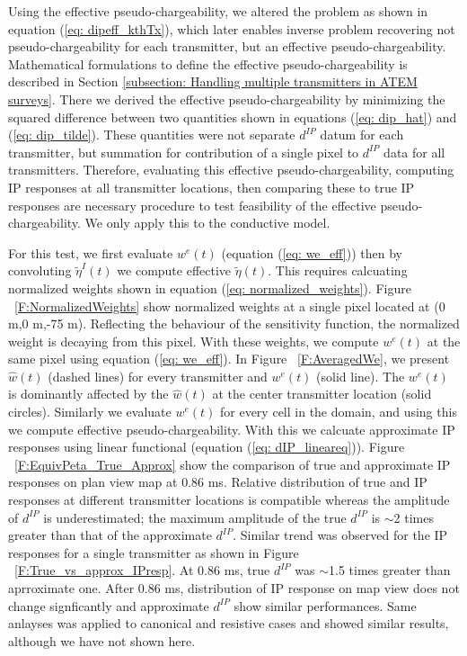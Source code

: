 \documentclass[extra,mreferee]{gji}
\newcommand{\peta}{\tilde{\eta}}
\newcommand{\dip}{d^{IP}}
\begin{document}
Using the effective pseudo-chargeability, we altered the problem as shown in equation (\ref{eq: dipeff_kthTx}), which later enables inverse problem recovering not pseudo-chargeability for each transmitter, but an effective pseudo-chargeability. Mathematical formulations to define the effective pseudo-chargeability is described in Section \ref{subsection: Handling multiple transmitters in ATEM surveys}. There we derived the effective pseudo-chargeability by minimizing the squared difference between two quantities shown in equations (\ref{eq: dip_hat}) and (\ref{eq: dip_tilde}). These quantities were not separate $\dip$ datum for each transmitter, but summation for contribution of a single pixel to $\dip$ data for all transmitters. 
Therefore, evaluating this effective pseudo-chargeability, computing IP responses at all transmitter locations, then comparing these to true IP responses are necessary procedure to test feasibility of the effective pseudo-chargeability. 
We only apply this to the conductive model. 

For this test, we first evaluate $w^e(t)$ (equation (\ref{eq: we_eff})) then by convoluting $\peta^I(t)$ we compute effective $\peta(t)$. 
This requires calcuating normalized weights shown in equation (\ref{eq: normalized_weights}). 
Figure ~\ref{F:NormalizedWeights} show normalized weights at a single pixel located at (0 m,0 m,-75 m). Reflecting the behaviour of the sensitivity function, the normalized weight is decaying from this pixel. 
With these weights, we compute $w^e(t)$ at the same pixel using equation (\ref{eq: we_eff}). 
In Figure ~\ref{F:AveragedWe}, we present $\hat{w}(t)$ (dashed lines) for every transmitter and $w^e(t)$ (solid line).
The $w^e(t)$ is dominantly affected by the $\hat{w}(t)$ at the center transmitter location (solid circles).
Similarly we evaluate $w^e(t)$ for every cell in the domain, and using this we compute effective pseudo-chargeability.
With this we calcuate approximate IP responses using linear functional (equation (\ref{eq: dIP_lineareq})).
Figure ~\ref{F:EquivPeta_True_Approx} show the comparison of true and approximate IP responses on plan view map at 0.86 ms. Relative distribution of true and IP responses at different transmitter locations is compatible whereas the amplitude of $\dip$ is underestimated; the maximum amplitude of the true $\dip$ is $\sim$2 times greater than that of the approximate $\dip$. 
Similar trend was observed for the IP responses for a single transmitter as shown in Figure ~\ref{F:True_vs_approx_IPresp}. At 0.86 ms, true $\dip$ was $\sim$1.5 times greater than aprroximate one. 
After 0.86 ms, distribution of IP response on map view does not change signficantly and approximate $\dip$ show similar performances.
Same anlayses was applied to canonical and resistive cases and showed similar results, although we have not shown here. 
\end{document}
